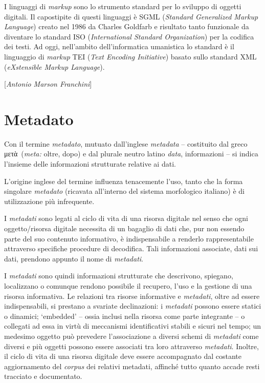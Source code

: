 {{I linguaggi di \emph{markup} sono lo strumento standard per lo sviluppo
di oggetti digitali. Il capostipite di questi linguaggi è SGML
(\emph{Standard Generalized Markup Language}) creato nel 1986 da Charles
Goldfarb e risultato tanto funzionale da diventare lo standard ISO
(\emph{International Standard Organization}) per la codifica dei testi.
Ad oggi, nell'ambito dell'informatica umanistica lo standard è il
linguaggio di \emph{markup} TEI (\emph{Text Encoding Initiative}) basato
sullo standard XML (\emph{eXstensible Markup Language}).

\hrulefill 

{[}\emph{Antonio Marson Franchini}{]}



\chapter{Metadato}

Con il termine \emph{metadato}, mutuato dall'inglese \emph{metadata} --
costituito dal greco μετὰ~(\emph{meta:} oltre, dopo) e dal plurale
neutro latino \emph{data}, informazioni -- si indica l'insieme delle
informazioni strutturate relative ai dati.

L'origine inglese del termine influenza tenacemente l'uso, tanto che la
forma singolare \emph{metadato} (ricavata all'interno del sistema
morfologico italiano) è di utilizzazione più infrequente.

I \emph{metadati} sono legati al ciclo di vita di una risorsa digitale
nel senso che ogni oggetto/risorsa digitale necessita di un bagaglio di
dati che, pur non essendo parte del suo contenuto informativo, è
indispensabile a renderlo rappresentabile attraverso specifiche
procedure di decodifica. Tali informazioni associate, dati sui dati,
prendono appunto il nome di \emph{metadati}.

I \emph{metadati} sono quindi informazioni strutturate che descrivono,
spiegano, localizzano o comunque rendono possibile il recupero, l'uso e
la gestione di una risorsa informativa. Le relazioni tra risorse
informative e \emph{metadati}, oltre ad essere indispensabili, si
prestano a svariate declinazioni: i \emph{metadati} possono essere
statici o dinamici; `embedded' -- ossia inclusi nella risorsa come parte
integrante -- o collegati ad essa in virtù di meccanismi identificativi
stabili e sicuri nel tempo; un medesimo oggetto può prevedere
l'associazione a diversi schemi di \emph{metadati} come diversi e più
oggetti possono essere associati tra loro attraverso \emph{metadati}.
Inoltre, il ciclo di vita di una risorsa digitale deve essere
accompagnato dal costante aggiornamento del \emph{corpus} dei relativi
metadati, affinché tutto quanto accade resti tracciato e documentato.

}}
